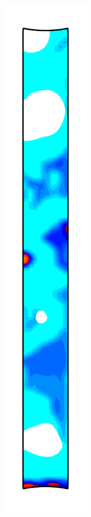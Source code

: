 \begin{figure}[!htb]
\begin{subfigure}{0.08\textwidth}
  \end{subfigure}
  \begin{subfigure}{0.08\textwidth}
    \centering
    \includegraphics[width=\textwidth]{Chapter5/figures/spallation/c_8}

\end{subfigure}
\end{figure}
